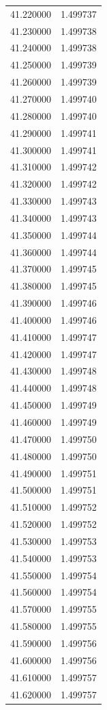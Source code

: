 \begin{tabular}{rr}
41.220000 & 1.499737 \\
41.230000 & 1.499738 \\
41.240000 & 1.499738 \\
41.250000 & 1.499739 \\
41.260000 & 1.499739 \\
41.270000 & 1.499740 \\
41.280000 & 1.499740 \\
41.290000 & 1.499741 \\
41.300000 & 1.499741 \\
41.310000 & 1.499742 \\
41.320000 & 1.499742 \\
41.330000 & 1.499743 \\
41.340000 & 1.499743 \\
41.350000 & 1.499744 \\
41.360000 & 1.499744 \\
41.370000 & 1.499745 \\
41.380000 & 1.499745 \\
41.390000 & 1.499746 \\
41.400000 & 1.499746 \\
41.410000 & 1.499747 \\
41.420000 & 1.499747 \\
41.430000 & 1.499748 \\
41.440000 & 1.499748 \\
41.450000 & 1.499749 \\
41.460000 & 1.499749 \\
41.470000 & 1.499750 \\
41.480000 & 1.499750 \\
41.490000 & 1.499751 \\
41.500000 & 1.499751 \\
41.510000 & 1.499752 \\
41.520000 & 1.499752 \\
41.530000 & 1.499753 \\
41.540000 & 1.499753 \\
41.550000 & 1.499754 \\
41.560000 & 1.499754 \\
41.570000 & 1.499755 \\
41.580000 & 1.499755 \\
41.590000 & 1.499756 \\
41.600000 & 1.499756 \\
41.610000 & 1.499757 \\
41.620000 & 1.499757 \\

\end{tabular}

